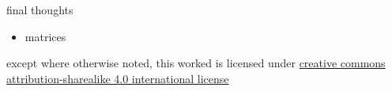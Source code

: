 \documentclass[10pt,t]{beamer}
\begin{document}
  \begin{frame}{final thoughts}
    \begin{itemize}
      \item matrices
    \end{itemize}
  \end{frame}


  \appendix

  \begin{frame}[c]
    \begin{center}\ccbysa\end{center}

    except where otherwise noted, this worked is licensed under
    \href{http://creativecommons.org/licenses/by-sa/4.0/}{creative commons
    attribution-sharealike 4.0 international license}
  \end{frame}
\end{document}
